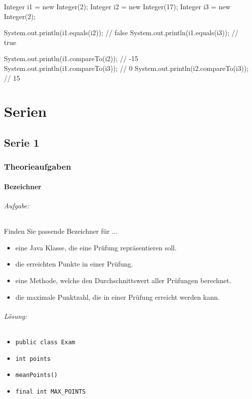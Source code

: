 \documentclass[a4paper,10pt, dvipsnames]{report}
\begin{document}
\begin{javacodebox}
Integer i1 = new Integer(2);
Integer i2 = new Integer(17);
Integer i3 = new Integer(2);

System.out.println(i1.equals(i2)); // false
System.out.println(i1.equals(i3)); // true

System.out.println(i1.compareTo(i2)); // -15
System.out.println(i1.compareTo(i3)); // 0
System.out.println(i2.compareTo(i3)); // 15
\end{javacodebox}





\part{Serien}
\chapter{Serie 1}
\section{Theorieaufgaben}

\subsection{Bezeichner}

\paragraph{Aufgabe:}
Finden Sie passende Bezeichner für ...
\begin{itemize}
    \item eine Java Klasse, die eine Prüfung repräsentieren soll.
    \item die erreichten Punkte in einer Prüfung.
    \item eine Methode, welche den Durchschnittswert aller Prüfungen berechnet.
    \item die maximale Punktzahl, die in einer Prüfung erreicht werden kann.
\end{itemize}

\paragraph{Lösung:}
\begin{itemize}
    \item \texttt{public class Exam {}}
    \item \texttt{int points}
    \item \texttt{meanPoints()}
    \item \texttt{final int MAX_POINTS}
\end{itemize}
\end{document}
